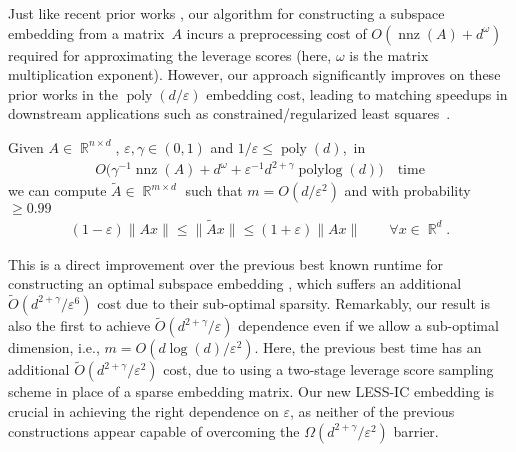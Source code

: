 \documentclass[11pt]{amsart}
\numberwithin{equation}{section}
\numberwithin{equation}{section}
\DeclareMathOperator{\R}{\mathbb{R}}
\DeclareMathOperator{\polylog}{polylog}
\DeclareMathOperator{\poly}{poly}
\DeclareMathOperator{\nnz}{nnz}
\theoremstyle{remark}
\theoremstyle{definition}
\begin{document}
Just like recent prior works \cite{chepurko2022near,cherapanamjeri2023optimal,chenakkod2024optimal}, our algorithm for constructing a subspace embedding from a matrix~$A$ incurs a preprocessing cost of $O(\nnz(A)+d^\omega)$ required for approximating the leverage scores (here, $\omega$ is the matrix multiplication exponent). However, our approach significantly improves on these prior works in the $\poly(d/\varepsilon)$ embedding cost, leading to matching speedups in downstream applications such as constrained/regularized least squares~\cite{chenakkod2024optimal}.
\begin{theorem}\label{t:fast}
    Given $A\!\in\!\R^{n\times d}$, $\varepsilon,\gamma\!\in\!(0,1)$ and $1/\varepsilon\!\leq\!\poly(d)$,~in
    \begin{align*}
        O\big(\gamma^{-1}\nnz(A) + d^\omega + \varepsilon^{-1} d^{2+\gamma}\polylog(d)\big)\quad\text{time}
    \end{align*}
    we can compute
    $\tilde A\in\R^{m\times d}$ such that $m=O(d/\varepsilon^2)$ and with probability $\geq 0.99$
  \begin{align*}
    (1-\varepsilon)\|Ax\|\leq \|\tilde A x\| \leq
    (1+\varepsilon)\|Ax\|\qquad\forall x\in\R^d.
  \end{align*}
\end{theorem}
This is a direct improvement over the previous best known runtime for constructing an optimal subspace embedding \cite{chenakkod2024optimal}, which suffers an additional $\tilde O(d^{2+\gamma}/\varepsilon^6)$ cost due to their sub-optimal sparsity. Remarkably, our result is also the first to achieve $\tilde O(d^{2+\gamma}/\varepsilon)$ dependence even if we allow a sub-optimal dimension, i.e., $m=O(d\log(d)/\varepsilon^2)$. Here, the previous best time \cite{chepurko2022near,cherapanamjeri2023optimal} has an additional $\tilde O(d^{2+\gamma}/\varepsilon^2)$ cost, due to using a two-stage leverage score sampling scheme in place of a sparse embedding matrix. Our new LESS-IC embedding is crucial in achieving the right dependence on $\varepsilon$, as neither of the previous constructions appear capable of overcoming the $\Omega(d^{2+\gamma}/\varepsilon^2)$ barrier.
\end{document}
